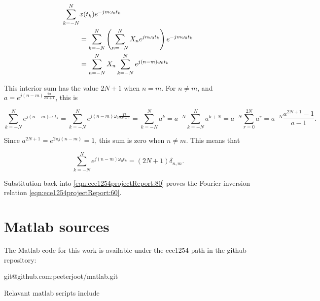 \documentclass[12pt,journal,compsoc]{../ieeepaper/IEEEtran}
\begin{document}
\begin{equation}\label{eqn:ece1254projectReport:80}
\begin{aligned}
\sum_{k = -N}^N &x(t_k) e^{-j m \omega_0 t_k} \\
&=
\sum_{k = -N}^N 
\lr{
\sum_{n = -N}^N X_n e^{ j n \omega_0 t_k}
}
e^{-j m \omega_0 t_k} \\
&=
\sum_{n = -N}^N X_n 
\sum_{k = -N}^N 
e^{ j (n -m )\omega_0 t_k}
\end{aligned}
\end{equation}

This interior sum has the value \( 2 N + 1 \) when \( n = m \).  For \( n \ne m \), and 
\( a = e^{j (n -m ) \frac{2 \pi}{2 N + 1}} \), this is

\begin{dmath}\label{eqn:ece1254projectReport:100}
\sum_{k = -N}^N 
e^{ j (n -m )\omega_0 t_k}
=
\sum_{k = -N}^N 
e^{ j (n -m )\omega_0 \frac{T k}{2 N + 1}}
=
\sum_{k = -N}^N a^k
=
a^{-N} \sum_{k = -N}^N a^{k+ N}
=
a^{-N} \sum_{r = 0}^{2 N} a^{r}
=
a^{-N} \frac{a^{2 N + 1} - 1}{a - 1}.
\end{dmath}

Since \( a^{2 N + 1} = e^{2 \pi j (n - m)} = 1 \), this sum is zero when \( n \ne m \).  This means that

\begin{equation}\label{eqn:ece1254projectReport:120}
\sum_{k = -N}^N 
e^{ j (n -m )\omega_0 t_k} = (2 N + 1) \delta_{n,m}.
\end{equation}

Substitution back into \cref{eqn:ece1254projectReport:80} proves the Fourier inversion relation \cref{eqn:ece1254projectReport:60}.

\section{Matlab sources}
\label{appendix:matlab}

The Matlab code for this work is available under the ece1254 path in the github repository:

\begin{center}
git@github.com:peeterjoot/matlab.git
\end{center}

Relavant matlab scripts include

%
\end{document}
